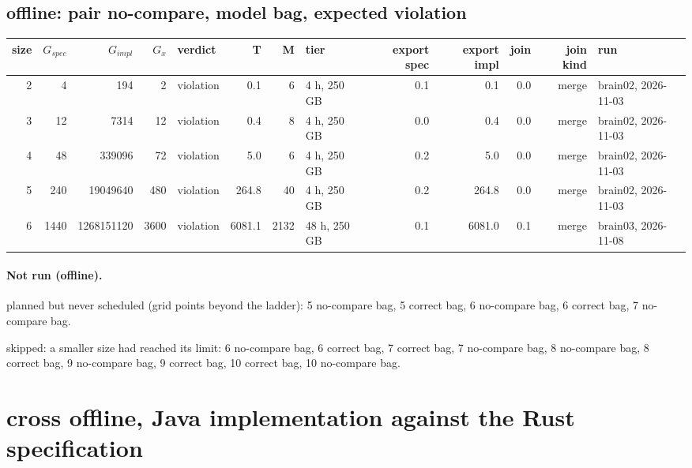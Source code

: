 \documentclass[10pt]{article}
\begin{document}
\subsection*{offline: pair \textsf{no-compare}, model bag, expected violation}
\begin{longtable}{@{}rrrrlrrlrrrrl@{}}
\toprule
size & $G_{\mathit{spec}}$ & $G_{\mathit{impl}}$ & $G_x$ & verdict & T & M & tier & export spec & export impl & join & join kind & run \\
\midrule
\endhead
\color{blue} 2 & 4 & 194 & 2 & violation & 0.1 & 6 & 4 h, 250 GB & 0.1 & 0.1 & 0.0 & merge & brain02, 2026-11-03 \\
\color{blue} 3 & 12 & 7314 & 12 & violation & 0.4 & 8 & 4 h, 250 GB & 0.0 & 0.4 & 0.0 & merge & brain02, 2026-11-03 \\
\color{blue} 4 & 48 & 339096 & 72 & violation & 5.0 & 6 & 4 h, 250 GB & 0.2 & 5.0 & 0.0 & merge & brain02, 2026-11-03 \\
\color{blue} 5 & 240 & 19049640 & 480 & violation & 264.8 & 40 & 4 h, 250 GB & 0.2 & 264.8 & 0.0 & merge & brain02, 2026-11-03 \\
\color{blue} 6 & 1440 & 1268151120 & 3600 & violation & 6081.1 & 2132 & 48 h, 250 GB & 0.1 & 6081.0 & 0.1 & merge & brain03, 2026-11-08 \\
\bottomrule
\end{longtable}
\paragraph{Not run (offline).}
planned but never scheduled (grid points beyond the ladder): 5 no-compare bag, 5 correct bag, 6 no-compare bag, 6 correct bag, 7 no-compare bag.\par
skipped: a smaller size had reached its limit: 6 no-compare bag, 6 correct bag, 7 correct bag, 7 no-compare bag, 8 no-compare bag, 8 correct bag, 9 no-compare bag, 9 correct bag, 10 correct bag, 10 no-compare bag.\par
\section*{cross offline, Java implementation against the Rust specification}
\end{document}
